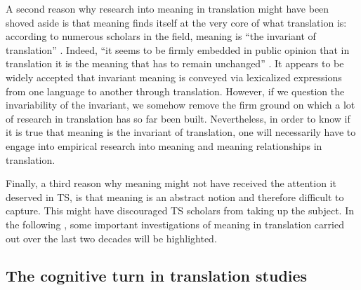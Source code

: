 A second reason why research into meaning in translation might have been shoved aside is that meaning finds itself at the very core of what translation is: according to numerous scholars in the field, meaning is “the invariant of translation” \citep[82]{lewandowska-tomasczyk_specification_2010}. Indeed, “it seems to be firmly embedded in public opinion that in translation it is the meaning that has to remain unchanged” \citep[82]{lewandowska-tomasczyk_specification_2010}. It appears to be widely accepted that invariant meaning is conveyed via lexicalized expressions from one language to another through translation. However, if we question the invariability of the invariant, we somehow remove the firm ground on which a lot of research in translation has so far been built. Nevertheless, in order to know if it is true that meaning is the invariant of translation, one will necessarily have to engage into empirical research into meaning and meaning relationships in translation.

Finally, a third reason why meaning might not have received the attention it deserved in TS, is that meaning is an abstract notion and therefore difficult to capture. This might have discouraged TS scholars from taking up the subject. In the following , some important investigations of meaning in translation carried out over the last two decades will be highlighted.

\subsection{The cognitive turn in translation studies}\label{sec:2.2.3}  
